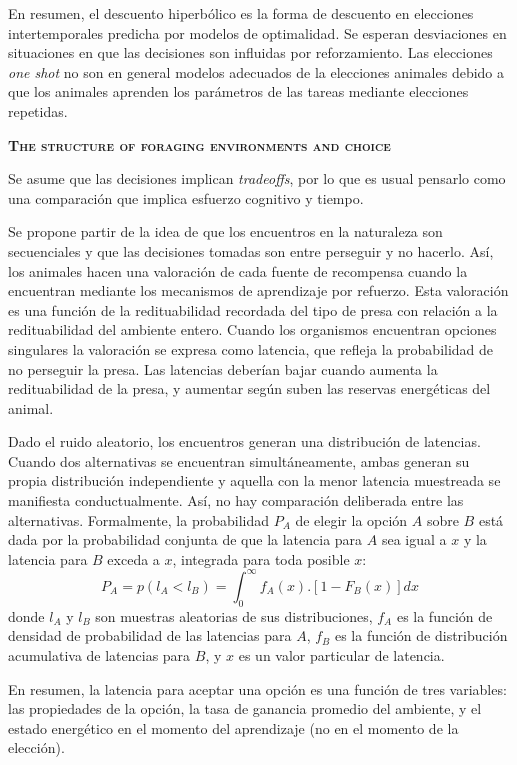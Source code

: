 \documentclass[a4paper,12pt]{article}
\begin{document}
En resumen, el descuento hiperbólico es la forma de descuento en elecciones intertemporales predicha por modelos de optimalidad. Se esperan desviaciones en situaciones en que las decisiones son influidas por reforzamiento. Las elecciones {\itshape one shot} no son en general modelos adecuados de la elecciones animales debido a que los animales aprenden los parámetros de las tareas mediante elecciones repetidas. 

{\scshape\bfseries The structure of foraging environments and choice}

Se asume que las decisiones implican {\itshape tradeoffs}, por lo que es usual pensarlo como una comparación que implica esfuerzo cognitivo y tiempo.

Se propone partir de la idea de que los encuentros en la naturaleza son secuenciales y que las decisiones tomadas son entre perseguir y no hacerlo. Así, los animales hacen una valoración de cada fuente de recompensa cuando la encuentran mediante los mecanismos de aprendizaje por refuerzo. Esta valoración es una función de la redituabilidad recordada del tipo de presa con relación a la redituabilidad del ambiente entero. Cuando los organismos encuentran opciones singulares la valoración se expresa como latencia, que refleja la probabilidad de no perseguir la presa. Las latencias deberían bajar cuando aumenta la redituabilidad de la presa, y aumentar según suben las reservas energéticas del animal.

Dado el ruido aleatorio, los encuentros generan una distribución de latencias. Cuando dos alternativas se encuentran simultáneamente, ambas generan su propia distribución independiente y aquella con la menor latencia muestreada se manifiesta conductualmente. Así, no hay comparación deliberada entre las alternativas. Formalmente, la probabilidad $P_{A}$ de elegir la opción $A$ sobre $B$ está dada por la probabilidad conjunta de que la latencia para $A$ sea igual a $x$ y la latencia para $B$ exceda a $x$, integrada para toda posible $x$:
\begin{equation}
	P_{A} = 
	p(l_{A}<l_{B}) =
	\int_{0}^{\infty}f_{A}(x).
	[
	1-F_{B}(x)
	]dx
\end{equation}
donde $l_{A}$ y $l_{B}$ son muestras aleatorias de sus distribuciones, $f_{A}$ es la función de densidad de probabilidad de las latencias para $A$, $f_{B}$ es la función de distribución acumulativa de latencias para $B$, y $x$ es un valor particular de latencia.

En resumen, la latencia para aceptar una opción es una función de tres variables: las propiedades de la opción, la tasa de ganancia promedio del ambiente, y el estado energético en el momento del aprendizaje (no en el momento de la elección).
\end{document}
